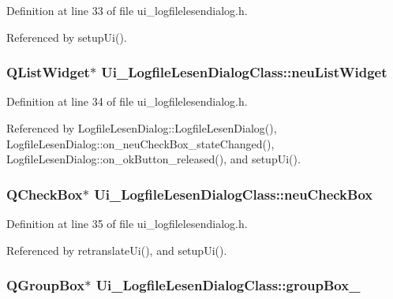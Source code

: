Definition at line 33 of file ui\_\-logfilelesendialog.h.

Referenced by setupUi().\hypertarget{class_ui___logfile_lesen_dialog_class_15ff7916c3a250b110f3a8d735af5f1e}{
\subsubsection[neuListWidget]{\setlength{\rightskip}{0pt plus 5cm}QListWidget$\ast$ {\bf Ui\_\-LogfileLesenDialogClass::neuListWidget}}}
\label{class_ui___logfile_lesen_dialog_class_15ff7916c3a250b110f3a8d735af5f1e}




Definition at line 34 of file ui\_\-logfilelesendialog.h.

Referenced by LogfileLesenDialog::LogfileLesenDialog(), LogfileLesenDialog::on\_\-neuCheckBox\_\-stateChanged(), LogfileLesenDialog::on\_\-okButton\_\-released(), and setupUi().\hypertarget{class_ui___logfile_lesen_dialog_class_83b2e113dea069bc1585100075685770}{
\subsubsection[neuCheckBox]{\setlength{\rightskip}{0pt plus 5cm}QCheckBox$\ast$ {\bf Ui\_\-LogfileLesenDialogClass::neuCheckBox}}}
\label{class_ui___logfile_lesen_dialog_class_83b2e113dea069bc1585100075685770}




Definition at line 35 of file ui\_\-logfilelesendialog.h.

Referenced by retranslateUi(), and setupUi().\hypertarget{class_ui___logfile_lesen_dialog_class_d527f4d0db097301320a301ba11dc14f}{
\subsubsection[groupBox\_\-2]{\setlength{\rightskip}{0pt plus 5cm}QGroupBox$\ast$ {\bf Ui\_\-LogfileLesenDialogClass::groupBox\_}}}
\label{class_ui___logfile_lesen_dialog_class_d527f4d0db097301320a301ba11dc14f}




